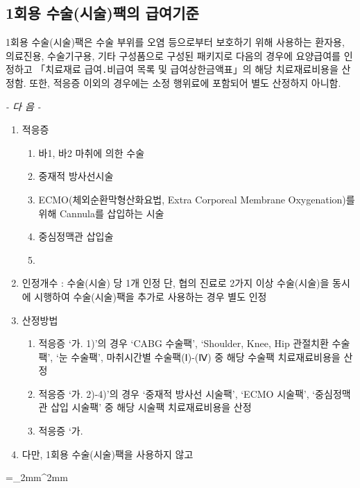 \subsection{1회용 수술(시술)팩의 급여기준}
1회용 수술(시술)팩은 수술 부위를 오염 등으로부터 보호하기 위해 사용하는 환자용, 의료진용, 수술기구용, 기타 구성품으로 구성된 패키지로 다음의 경우에 요양급여를 인정하고 「치료재료 급여․비급여 목록 및 급여상한금액표」의 해당 치료재료비용을 산정함. 또한, 적응증 이외의 경우에는 소정 행위료에 포함되어 별도 산정하지 아니함.\par
\emph{- 다   음 -}
\begin{enumerate}[가.]\tightlist
\item 적응증
	\begin{enumerate}[1)]\tightlist
	\item 바1, 바2 마취에 의한 수술
	\item 중재적 방사선시술
	\item ECMO(체외순환막형산화요법, Extra Corporeal Membrane Oxygenation)를 위해 Cannula를 삽입하는 시술
	\item 중심정맥관 삽입술
	\item {}
	\end{enumerate}
\item 인정개수 : 수술(시술) 당 1개 인정
   단, 협의 진료로 2가지 이상 수술(시술)을 동시에 시행하여 수술(시술)팩을 추가로 사용하는 경우 별도 인정
\item 산정방법
	\begin{enumerate}[1)]\tightlist
	\item 적응증 ‘가. 1)’의 경우 ‘CABG 수술팩’, ‘Shoulder, Knee, Hip 관절치환 수술팩’, ‘눈 수술팩’, 마취시간별 수술팩(Ⅰ)-(Ⅳ) 중 해당 수술팩 치료재료비용을 산정
	\item 적응증 ‘가. 2)-4)’의 경우 ‘중재적 방사선 시술팩’, ‘ECMO 시술팩’, ‘중심정맥관 삽입 시술팩’ 중 해당 시술팩 치료재료비용을 산정
	\item 적응증 ‘가. 
	\end{enumerate}
\item 다만, 1회용 수술(시술)팩을 사용하지 않고 
\end{enumerate}
\par 
\tabulinesep =_2mm^2mm
